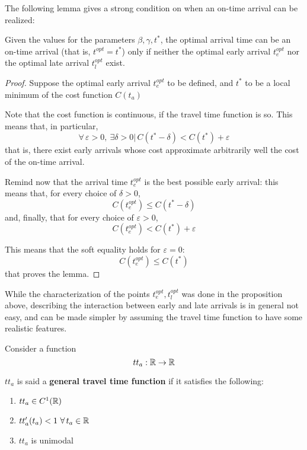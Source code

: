 The following lemma gives a strong condition on when an on-time arrival can be realized:
\begin{lemma}
  \label{lemma:where-no-ot}
  Given the values for the parameters \(\beta, \gamma, t^*\),
  the optimal arrival time can be an on-time arrival (that is, \(t^{opt} = t^*\)) only if neither the optimal early arrival \(t_e^{opt}\) nor the optimal late arrival \(t_l^{opt}\) exist.
\end{lemma}
\begin{proof}
  Suppose the optimal early arrival \(t_e^{opt}\) to be defined,
  and \(t^*\) to be a local minimum of the cost function \(C(t_a)\)

  Note that the cost function is continuous,
  if the travel time function is so.
  This means that, in particular,
  \begin{equation*}
    \forall\, \varepsilon > 0,\ \exists \delta > 0 |\, C(t^* - \delta) < C(t^*) + \varepsilon
  \end{equation*}
  that is, there exist early arrivals whose cost approximate arbitrarily well the cost of the on-time arrival.

  Remind now that the arrival time \(t_e^{opt}\) is the best possible early arrival:
  this means that, for every choice of \(\delta > 0\),
  \begin{equation*}
    C(t_e^{opt}) \leq C(t^* - \delta)
  \end{equation*}
  and, finally, that for every choice of \(\varepsilon > 0\),
  \begin{equation*}
    C(t_e^{opt}) < C(t^*) + \varepsilon
  \end{equation*}

  This means that the soft equality holds for \(\varepsilon = 0\):
  \begin{equation*}
    C(t_e^{opt}) \leq C(t^*)
  \end{equation*}
  that proves the lemma.
\end{proof}

While the characterization of the points \(t_e^{opt}, t_l^{opt}\) was done in the proposition above,
describing the interaction between early and late arrivals is in general not easy,
and can be made simpler by assuming the travel time function to have some realistic features.

\begin{definition}
  \label{def:gen-tt-fun}
  Consider a function
  \begin{equation*}
    tt_a: \mathbb{R} \rightarrow \mathbb{R}
  \end{equation*}

  \(tt_a\) is said a \textbf{general travel time function} if it satisfies the following:
  \begin{enumerate}
  \item \(tt_a \in C^1(\mathbb{R})\)
  \item \(tt_a'(t_a) < 1\ \forall\, t_a\in \mathbb{R}\)
  \item \(tt_a\) is unimodal
  \end{enumerate}
\end{definition}

